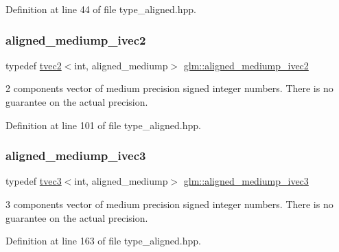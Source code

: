 Definition at line 44 of file type\+\_\+aligned.\+hpp.

\mbox{\label{group__gtc__type__aligned_ga7c713a802c9a63481c0bab775e16d003}} 
\subsubsection{\texorpdfstring{aligned\_mediump\_ivec2}{aligned\_mediump\_ivec2}}
{\footnotesize\ttfamily typedef \mbox{\hyperlink{structglm_1_1tvec2}{tvec2}}$<$int, aligned\+\_\+mediump$>$ \mbox{\hyperlink{group__gtc__type__aligned_ga7c713a802c9a63481c0bab775e16d003}{glm\+::aligned\+\_\+mediump\+\_\+ivec2}}}

2 components vector of medium precision signed integer numbers. There is no guarantee on the actual precision. 

Definition at line 101 of file type\+\_\+aligned.\+hpp.

\mbox{\label{group__gtc__type__aligned_gad97de0d98f61227f3504dcd5f965ff3a}} 
\subsubsection{\texorpdfstring{aligned\_mediump\_ivec3}{aligned\_mediump\_ivec3}}
{\footnotesize\ttfamily typedef \mbox{\hyperlink{structglm_1_1tvec3}{tvec3}}$<$int, aligned\+\_\+mediump$>$ \mbox{\hyperlink{group__gtc__type__aligned_gad97de0d98f61227f3504dcd5f965ff3a}{glm\+::aligned\+\_\+mediump\+\_\+ivec3}}}

3 components vector of medium precision signed integer numbers. There is no guarantee on the actual precision. 

Definition at line 163 of file type\+\_\+aligned.\+hpp.

\mbox{\label{group__gtc__type__aligned_ga76b2981eb152332dd1404b00a15eac50}} 
